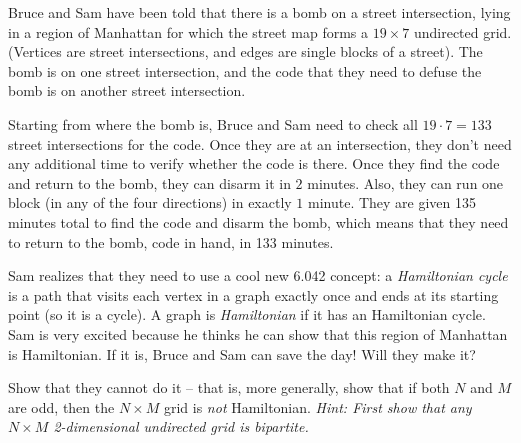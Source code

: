 \documentclass[12pt,twoside]{article}
\begin{document}
\begin{problem}{14} 

    Bruce and Sam have been told that there is a bomb on a street intersection, lying in a region of Manhattan for which the street map forms a $19 \times 7$ undirected grid. (Vertices are street intersections, and edges are single blocks of a street). The bomb is on one street intersection, and the code that they need to defuse the bomb is on another street intersection.

    Starting from where the bomb is, Bruce and Sam need to check all $19 \cdot 7 = 133$ street intersections for the code. Once they are at an intersection, they don't need any additional time to verify whether the code is there. Once they find the code and return to the bomb, they can disarm it in $2$ minutes. Also, they can run one block (in any of the four directions) in exactly $1$ minute. They are given 135 minutes total to find the code and disarm the bomb, which means that they need to return to the bomb, code in hand, in 133 minutes.

    Sam realizes that they need to use a cool new 6.042 concept: a \emph{Hamiltonian cycle} is a path that visits each vertex in a graph exactly once and ends at its starting point (so it is a cycle). A graph is \emph{Hamiltonian} if it has an Hamiltonian cycle. Sam is very excited because he thinks he can show that this region of Manhattan is Hamiltonian. If it is, Bruce and Sam can save the day! Will they make it?

\bparts

 Show that they cannot do it -- that is, more generally, show that if both $N$ and $M$ are odd, then the $N \times M$ grid is \emph{not} Hamiltonian.
\emph{Hint: First show that any $N \times M$ 2-dimensional undirected grid is bipartite.}



\end{problem}
\end{document}
